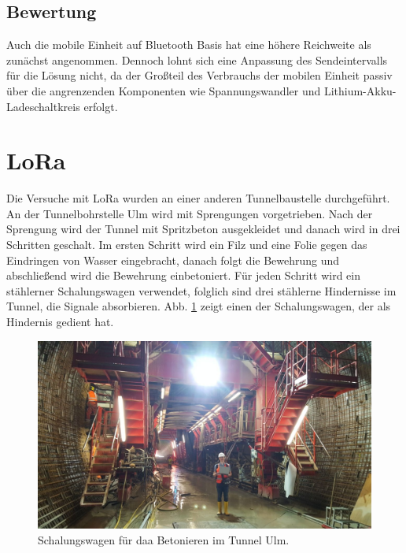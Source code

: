 \subsection{Bewertung}
Auch die mobile Einheit auf Bluetooth Basis hat eine höhere Reichweite als zunächst angenommen. 
Dennoch lohnt sich eine Anpassung des Sendeintervalls für die Lösung nicht, da der Großteil des Verbrauchs der mobilen Einheit passiv über die angrenzenden Komponenten wie Spannungswandler und Lithium-Akku-Ladeschaltkreis erfolgt.





\section{LoRa}
Die Versuche mit LoRa wurden an einer anderen Tunnelbaustelle durchgeführt.
An der Tunnelbohrstelle Ulm wird mit Sprengungen vorgetrieben.
Nach der Sprengung wird der Tunnel mit Spritzbeton ausgekleidet und danach wird in drei Schritten geschalt. 
Im ersten Schritt wird ein Filz und eine Folie gegen das Eindringen von Wasser eingebracht, danach folgt die Bewehrung und abschließend wird die Bewehrung einbetoniert.
Für jeden Schritt wird ein stählerner Schalungswagen verwendet, folglich sind drei stählerne Hindernisse im Tunnel, die Signale absorbieren.
Abb. \ref{fig:schalungswagen} zeigt einen der Schalungswagen, der als Hindernis gedient hat.

\begin{figure}[h]
  \centering
	\includegraphics[width=\textwidth]{images/schalungswagen.jpg}
  \caption{Schalungswagen für daa Betonieren im Tunnel Ulm.}
  \label{fig:schalungswagen}
\end{figure}

